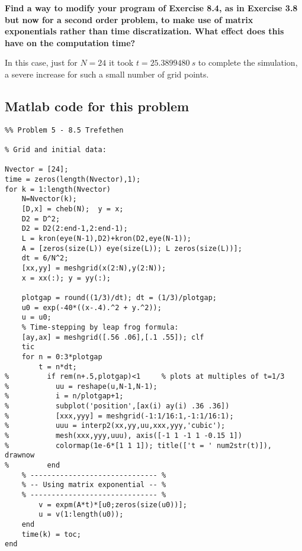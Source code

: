 \textbf{Find a way to modify your program of Exercise 8.4, as in Exercise 3.8 but now for a second order problem, to make use of matrix exponentials rather than time discratization. What effect does this have on the computation time?}
\newline

In this case, just for $N=24$ it took $t=  25.3899480~s$ to complete the simulation, a severe increase for such a small number of grid points.

\subsection*{Matlab code for this problem}
\begin{verbatim}
%% Problem 5 - 8.5 Trefethen

% Grid and initial data:

Nvector = [24];
time = zeros(length(Nvector),1);
for k = 1:length(Nvector)
    N=Nvector(k);
    [D,x] = cheb(N);  y = x;
    D2 = D^2;
    D2 = D2(2:end-1,2:end-1);
    L = kron(eye(N-1),D2)+kron(D2,eye(N-1));
    A = [zeros(size(L)) eye(size(L)); L zeros(size(L))];
    dt = 6/N^2;
    [xx,yy] = meshgrid(x(2:N),y(2:N));
    x = xx(:); y = yy(:);

    plotgap = round((1/3)/dt); dt = (1/3)/plotgap;
    u0 = exp(-40*((x-.4).^2 + y.^2));
    u = u0;
    % Time-stepping by leap frog formula:
    [ay,ax] = meshgrid([.56 .06],[.1 .55]); clf
    tic
    for n = 0:3*plotgap
        t = n*dt;
%         if rem(n+.5,plotgap)<1     % plots at multiples of t=1/3
%           uu = reshape(u,N-1,N-1);
%           i = n/plotgap+1;
%           subplot('position',[ax(i) ay(i) .36 .36])
%           [xxx,yyy] = meshgrid(-1:1/16:1,-1:1/16:1);
%           uuu = interp2(xx,yy,uu,xxx,yyy,'cubic');
%           mesh(xxx,yyy,uuu), axis([-1 1 -1 1 -0.15 1])
%           colormap(1e-6*[1 1 1]); title(['t = ' num2str(t)]), drawnow
%         end
    % ------------------------------ %    
    % -- Using matrix exponential -- %
    % ------------------------------ %    
        v = expm(A*t)*[u0;zeros(size(u0))];
        u = v(1:length(u0));
    end
    time(k) = toc;
end
\end{verbatim}